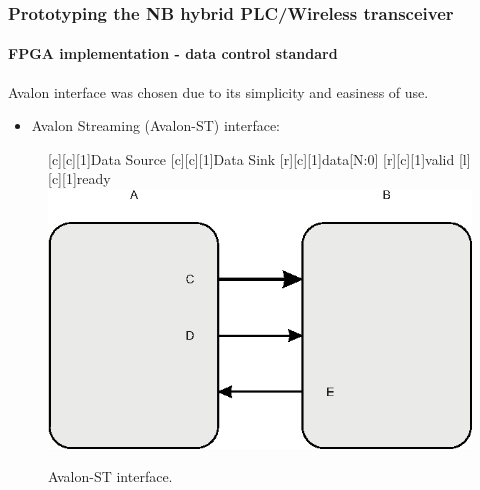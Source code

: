 \documentclass[mathserif]{beamer}
\newcommand{\wait}{\vfill}
\begin{document}
\begin{frame}
	\frametitle{\normalsize{Prototyping the NB hybrid PLC/Wireless transceiver}}
	\framesubtitle{FPGA implementation - data control standard}
	Avalon interface was chosen due to its simplicity and easiness of use. \wait
	\begin{itemize}
		\item Avalon Streaming (Avalon-ST) interface:
	\end{itemize}
	\renewcommand{\sizeLetter}{1}
	\begin{figure}
		\centering
		[\sizeLetter]{Data Source}
		[\sizeLetter]{Data Sink}
		[\sizeLetter]{data[N:0]}
		[\sizeLetter]{valid}
		[\sizeLetter]{ready}
		\includegraphics[width=0.5\linewidth]{figuras/avalon-st}
		\caption{Avalon-ST interface.}
		\label{fig:avalon-st}
	\end{figure}
\end{frame}
\end{document}
